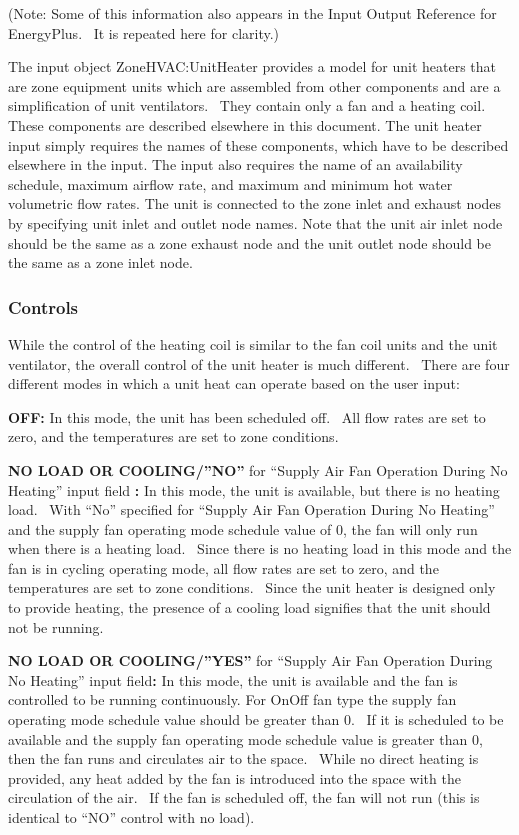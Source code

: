 (Note: Some of this information also appears in the Input Output Reference for EnergyPlus.~ It is repeated here for clarity.)

The input object ZoneHVAC:UnitHeater provides a model for unit heaters that are zone equipment units which are assembled from other components and are a simplification of unit ventilators.~ They contain only a fan and a heating coil. These components are described elsewhere in this document. The unit heater input simply requires the names of these components, which have to be described elsewhere in the input. The input also requires the name of an availability schedule, maximum airflow rate, and maximum and minimum hot water volumetric flow rates. The unit is connected to the zone inlet and exhaust nodes by specifying unit inlet and outlet node names. Note that the unit air inlet node should be the same as a zone exhaust node and the unit outlet node should be the same as a zone inlet node.

\subsubsection{Controls}\label{controls-1-000}

While the control of the heating coil is similar to the fan coil units and the unit ventilator, the overall control of the unit heater is much different.~ There are four different modes in which a unit heat can operate based on the user input:

\textbf{OFF:} In this mode, the unit has been scheduled off.~ All flow rates are set to zero, and the temperatures are set to zone conditions.

\textbf{NO LOAD OR COOLING/''NO''} for ``Supply Air Fan Operation During No Heating'' input field \textbf{:} In this mode, the unit is available, but there is no heating load.~ With ``No'' specified for ``Supply Air Fan Operation During No Heating'' and the supply fan operating mode schedule value of 0, the fan will only run when there is a heating load.~ Since there is no heating load in this mode and the fan is in cycling operating mode, all flow rates are set to zero, and the temperatures are set to zone conditions.~ Since the unit heater is designed only to provide heating, the presence of a cooling load signifies that the unit should not be running.

\textbf{NO LOAD OR COOLING/''YES''} for ``Supply Air Fan Operation During No Heating'' input field\textbf{:} In this mode, the unit is available and the fan is controlled to be running continuously. For OnOff fan type the supply fan operating mode schedule value should be greater than 0.~ If it is scheduled to be available and the supply fan operating mode schedule value is greater than 0, then the fan runs and circulates air to the space.~ While no direct heating is provided, any heat added by the fan is introduced into the space with the circulation of the air.~ If the fan is scheduled off, the fan will not run (this is identical to ``NO'' control with no load).

